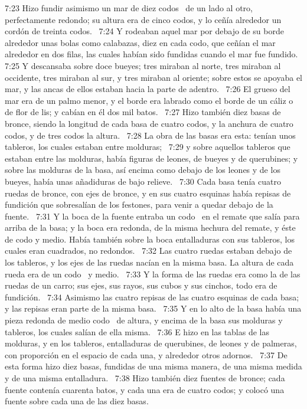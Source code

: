 7:23 Hizo fundir asimismo un mar de diez codos  de un lado al otro, perfectamente redondo; su altura era de cinco codos, y lo ceñía alrededor un cordón de treinta codos.  
7:24 Y rodeaban aquel mar por debajo de su borde alrededor unas bolas como calabazas, diez en cada codo, que ceñían el mar alrededor en dos filas, las cuales habían sido fundidas cuando el mar fue fundido.  
7:25 Y descansaba sobre doce bueyes; tres miraban al norte, tres miraban al occidente, tres miraban al sur, y tres miraban al oriente; sobre estos se apoyaba el mar, y las ancas de ellos estaban hacia la parte de adentro.  
7:26 El grueso del mar era de un palmo menor, y el borde era labrado como el borde de un cáliz o de flor de lis; y cabían en él dos mil batos.  
7:27 Hizo también diez basas de bronce, siendo la longitud de cada basa de cuatro codos, y la anchura de cuatro codos, y de tres codos la altura.  
7:28 La obra de las basas era esta: tenían unos tableros, los cuales estaban entre molduras;  
7:29 y sobre aquellos tableros que estaban entre las molduras, había figuras de leones, de bueyes y de querubines; y sobre las molduras de la basa, así encima como debajo de los leones y de los bueyes, había unas añadiduras de bajo relieve.  
7:30 Cada basa tenía cuatro ruedas de bronce, con ejes de bronce, y en sus cuatro esquinas había repisas de fundición que sobresalían de los festones, para venir a quedar debajo de la fuente.  
7:31 Y la boca de la fuente entraba un codo  en el remate que salía para arriba de la basa; y la boca era redonda, de la misma hechura del remate, y éste de codo y medio. Había también sobre la boca entalladuras con sus tableros, los cuales eran cuadrados, no redondos.  
7:32 Las cuatro ruedas estaban debajo de los tableros, y los ejes de las ruedas nacían en la misma basa. La altura de cada rueda era de un codo  y medio.  
7:33 Y la forma de las ruedas era como la de las ruedas de un carro; sus ejes, sus rayos, sus cubos y sus cinchos, todo era de fundición.  
7:34 Asimismo las cuatro repisas de las cuatro esquinas de cada basa; y las repisas eran parte de la misma basa.  
7:35 Y en lo alto de la basa había una pieza redonda de medio codo  de altura, y encima de la basa sus molduras y tableros, los cuales salían de ella misma.  
7:36 E hizo en las tablas de las molduras, y en los tableros, entalladuras de querubines, de leones y de palmeras, con proporción en el espacio de cada una, y alrededor otros adornos.  
7:37 De esta forma hizo diez basas, fundidas de una misma manera, de una misma medida y de una misma entalladura.  
7:38 Hizo también diez fuentes de bronce; cada fuente contenía cuarenta batos, y cada una era de cuatro codos; y colocó una fuente sobre cada una de las diez basas.  
